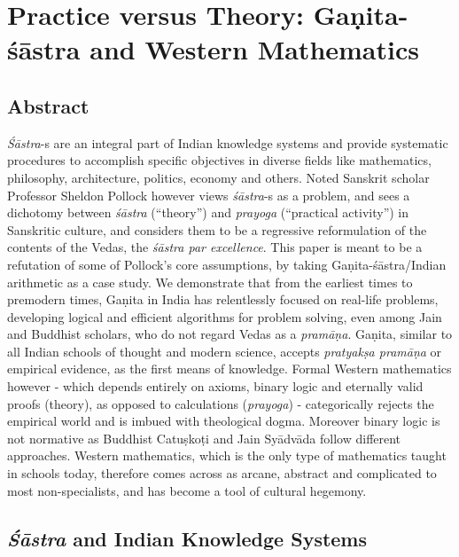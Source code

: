 \chapter{Practice versus Theory: Gaṇita-śāstra and Western Mathematics}\label{chapter5}


\section*{Abstract}

{\sl Śāstra}-s are an integral part of Indian knowledge systems and provide systematic procedures to accomplish specific objectives in diverse fields like mathematics, philosophy, architecture, politics, economy and others. Noted Sanskrit scholar Professor Sheldon Pollock however views {\sl śāstra}-s as a problem, and sees a dichotomy between {\sl śāstra} (``theory'') and {\sl prayoga} (``practical activity'') in Sanskritic culture, and considers them to be a regressive reformulation of the contents of the Vedas, the {\sl śāstra par excellence}. This paper is meant to be a refutation of some of Pollock's core assumptions, by taking Gaṇita-śāstra/Indian arithmetic as a case study. We demonstrate that from the earliest times to premodern times, Gaṇita in India has relentlessly focused on real-life problems, developing logical and efficient algorithms for problem solving, even among Jain and Buddhist scholars, who do not regard Vedas as a {\sl pramāṇa}. Gaṇita, similar to all Indian schools of thought and modern science, accepts {\sl pratyakṣa pramāṇa} or empirical evidence, as the first means of knowledge. Formal Western mathematics however - which depends entirely on axioms, binary logic and eternally valid proofs (theory), as opposed to calculations ({\sl prayoga}) -  categorically rejects the empirical world and is imbued with theological dogma. Moreover binary logic is not normative as Buddhist Catuṣkoṭi and Jain Syādvāda follow different approaches. Western mathematics, which is the only type of mathematics taught in schools today, therefore comes across as arcane, abstract and complicated to most non-specialists, and has become a tool of cultural hegemony.  

\section*{{\sl\bfseries Śāstra} and Indian Knowledge Systems}

